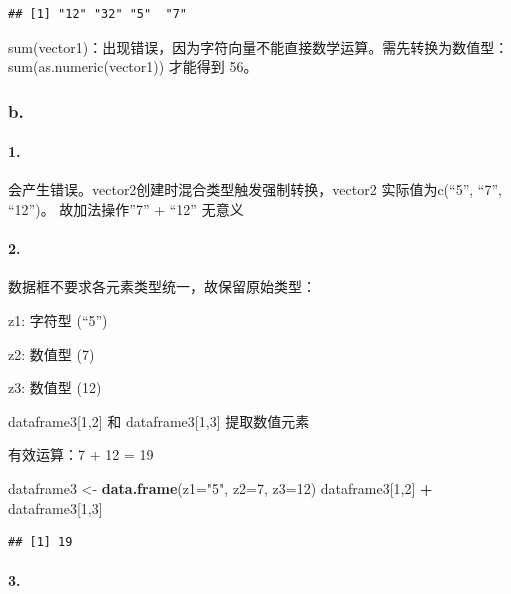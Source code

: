 \documentclass[
]{article}
\newenvironment{Shaded}{\begin{snugshade}}{\end{snugshade}}
\newcommand{\AttributeTok}[1]{\textcolor[rgb]{0.13,0.29,0.53}{#1}}
\newcommand{\DecValTok}[1]{\textcolor[rgb]{0.00,0.00,0.81}{#1}}
\newcommand{\FunctionTok}[1]{\textcolor[rgb]{0.13,0.29,0.53}{\textbf{#1}}}
\newcommand{\NormalTok}[1]{#1}
\newcommand{\OtherTok}[1]{\textcolor[rgb]{0.56,0.35,0.01}{#1}}
\newcommand{\SpecialCharTok}[1]{\textcolor[rgb]{0.81,0.36,0.00}{\textbf{#1}}}
\newcommand{\StringTok}[1]{\textcolor[rgb]{0.31,0.60,0.02}{#1}}
\begin{document}
\begin{verbatim}
## [1] "12" "32" "5"  "7"
\end{verbatim}

sum(vector1)：出现错误，因为字符向量不能直接数学运算。需先转换为数值型：sum(as.numeric(vector1))
才能得到 56。

\subsubsection{b.}\label{b.-1}

\paragraph{1.}\label{section}

会产生错误。vector2创建时混合类型触发强制转换，vector2 实际值为c(``5'',
``7'', ``12'')。 故加法操作''7'' + ``12'' 无意义

\paragraph{2.}\label{section-1}

数据框不要求各元素类型统一，故保留原始类型：

z1: 字符型 (``5'')

z2: 数值型 (7)

z3: 数值型 (12)

dataframe3{[}1,2{]} 和 dataframe3{[}1,3{]} 提取数值元素

有效运算：7 + 12 = 19

\begin{Shaded}
\begin{Highlighting}[]
\NormalTok{dataframe3 }\OtherTok{\textless{}{-}} \FunctionTok{data.frame}\NormalTok{(}\AttributeTok{z1=}\StringTok{"5"}\NormalTok{, }\AttributeTok{z2=}\DecValTok{7}\NormalTok{, }\AttributeTok{z3=}\DecValTok{12}\NormalTok{)  }
\NormalTok{dataframe3[}\DecValTok{1}\NormalTok{,}\DecValTok{2}\NormalTok{] }\SpecialCharTok{+}\NormalTok{ dataframe3[}\DecValTok{1}\NormalTok{,}\DecValTok{3}\NormalTok{]    }
\end{Highlighting}
\end{Shaded}

\begin{verbatim}
## [1] 19
\end{verbatim}

\paragraph{3.}\label{section-2}
\end{document}
